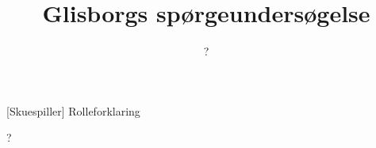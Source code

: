 \documentclass[a4paper,11pt]{article}
\title{Glisborgs spørgeundersøgelse}
\author{?}
\begin{document}
\maketitle

\begin{roles}
[Skuespiller] Rolleforklaring
\end{roles}

\begin{sketch}
?
\end{sketch}
\end{document}
